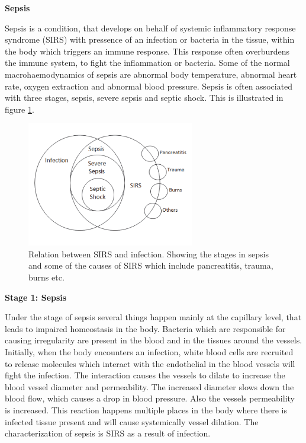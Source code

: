 
\label{chap:sepsis}
\textbf{Sepsis}

Sepsis is a condition, that develops on behalf of systemic inflammatory response syndrome (SIRS) with pressence of an infection or bacteria in the tissue, within the body which triggers an immune response. This response often overburdens the immune system, to fight the inflammation or bacteria. Some of the normal macrohaemodynamics of sepsis are abnormal body temperature, abnormal heart rate, oxygen extraction and abnormal blood pressure.\cite{pluta2010,kanta2014}
Sepsis is often associated with three stages, sepsis, severe sepsis and septic shock. This is illustrated in figure \ref{fig:Sepsis_stages}.

\begin{figure}[H]
	\centering	\includegraphics[width=0.65\textwidth]{figures/Sepsis_stages}
	\caption{Relation between SIRS and infection. Showing the stages in sepsis and some of the causes of SIRS which include pancreatitis, trauma, burns etc.\cite{kanta2014}}
	\label{fig:Sepsis_stages}
\end{figure} \vspace{-.3cm}


\textbf{Stage 1: Sepsis}

Under the stage of sepsis several things happen mainly at the capillary level, that leads to impaired homeostasis in the body. Bacteria which are responsible for causing irregularity are present in the blood and in the tissues around the vessels. Initially, when the body encounters an infection, white blood cells are recruited to release molecules which interact with the endothelial in the blood vessels will fight the infection. The interaction causes the vessels to dilate to increase the blood vessel diameter and permeability. The increased diameter slows down the blood flow, which causes a drop in blood pressure. Also the vessels permeability is increased. This reaction happens multiple places in the body where there is infected tissue present and will cause systemically vessel dilation. The characterization of sepsis is SIRS as a result of infection.\cite{baudouin2008,kanta2014}


